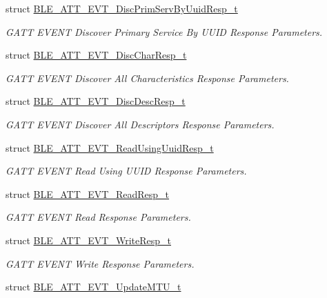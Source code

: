 \begin{DoxyCompactItemize}
struct \hyperlink{struct_b_l_e___a_t_t___e_v_t___disc_prim_serv_by_uuid_resp__t}{B\+L\+E\+\_\+\+A\+T\+T\+\_\+\+E\+V\+T\+\_\+\+Disc\+Prim\+Serv\+By\+Uuid\+Resp\+\_\+t}
\begin{DoxyCompactList}\small\item\em G\+A\+TT E\+V\+E\+NT Discover Primary Service By U\+U\+ID Response Parameters. \end{DoxyCompactList}\item 
struct \hyperlink{struct_b_l_e___a_t_t___e_v_t___disc_char_resp__t}{B\+L\+E\+\_\+\+A\+T\+T\+\_\+\+E\+V\+T\+\_\+\+Disc\+Char\+Resp\+\_\+t}
\begin{DoxyCompactList}\small\item\em G\+A\+TT E\+V\+E\+NT Discover All Characteristics Response Parameters. \end{DoxyCompactList}\item 
struct \hyperlink{struct_b_l_e___a_t_t___e_v_t___disc_desc_resp__t}{B\+L\+E\+\_\+\+A\+T\+T\+\_\+\+E\+V\+T\+\_\+\+Disc\+Desc\+Resp\+\_\+t}
\begin{DoxyCompactList}\small\item\em G\+A\+TT E\+V\+E\+NT Discover All Descriptors Response Parameters. \end{DoxyCompactList}\item 
struct \hyperlink{struct_b_l_e___a_t_t___e_v_t___read_using_uuid_resp__t}{B\+L\+E\+\_\+\+A\+T\+T\+\_\+\+E\+V\+T\+\_\+\+Read\+Using\+Uuid\+Resp\+\_\+t}
\begin{DoxyCompactList}\small\item\em G\+A\+TT E\+V\+E\+NT Read Using U\+U\+ID Response Parameters. \end{DoxyCompactList}\item 
struct \hyperlink{struct_b_l_e___a_t_t___e_v_t___read_resp__t}{B\+L\+E\+\_\+\+A\+T\+T\+\_\+\+E\+V\+T\+\_\+\+Read\+Resp\+\_\+t}
\begin{DoxyCompactList}\small\item\em G\+A\+TT E\+V\+E\+NT Read Response Parameters. \end{DoxyCompactList}\item 
struct \hyperlink{struct_b_l_e___a_t_t___e_v_t___write_resp__t}{B\+L\+E\+\_\+\+A\+T\+T\+\_\+\+E\+V\+T\+\_\+\+Write\+Resp\+\_\+t}
\begin{DoxyCompactList}\small\item\em G\+A\+TT E\+V\+E\+NT Write Response Parameters. \end{DoxyCompactList}\item 
struct \hyperlink{struct_b_l_e___a_t_t___e_v_t___update_m_t_u__t}{B\+L\+E\+\_\+\+A\+T\+T\+\_\+\+E\+V\+T\+\_\+\+Update\+M\+T\+U\+\_\+t}

\end{DoxyCompactItemize}
